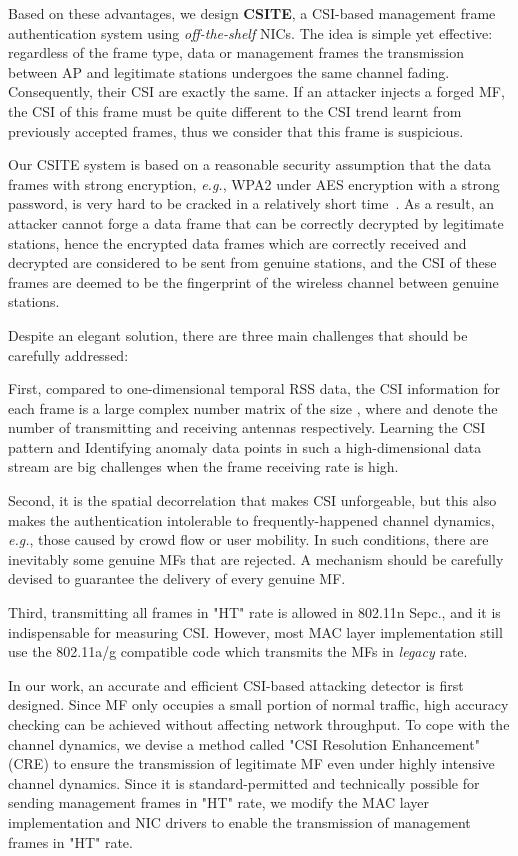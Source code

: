 \documentclass[conference]{IEEEtran}
\def\eg{\textit{e.g.}\xspace}
\begin{document}
Based on these advantages, we design \textbf{CSITE}, a CSI-based management frame
authentication system using \textit{off-the-shelf} NICs.
The idea is simple yet effective: regardless of the frame type, data or management frames
 the transmission between AP and legitimate stations undergoes
 the same channel fading. Consequently, their CSI are exactly the same.
If an attacker injects a forged MF, the CSI of this frame
 must be quite different to the CSI trend learnt from previously
 accepted frames, thus we consider that this frame is suspicious.

Our CSITE system is based on a reasonable security assumption that the
 data frames with strong encryption, \eg, WPA2 under AES encryption
 with a strong password, is very hard to be cracked in a relatively short time~\cite{mitchell2005security}.
As a result, an attacker cannot forge a data
 frame that can be correctly decrypted by legitimate
 stations, hence the encrypted data frames which are correctly received and decrypted are considered to be
 sent from genuine stations, and the CSI of these frames are deemed to be the fingerprint of the wireless channel between genuine stations.

Despite an elegant solution, there are three main challenges that should be
 carefully addressed:

First, compared to one-dimensional temporal RSS data, the CSI information for each frame is a
 large complex number matrix of the size , where  and  denote the number of
 transmitting and receiving antennas respectively. Learning the CSI pattern and
Identifying anomaly data points in such a high-dimensional data stream
are big challenges when the frame receiving rate  is high.

Second, it is the spatial decorrelation that makes CSI
 unforgeable, but this also makes the authentication intolerable to frequently-happened channel dynamics, \eg, those caused by crowd flow or user mobility.
In such conditions, there are inevitably some genuine MFs that are rejected.
 A mechanism should be carefully devised to
 guarantee the delivery of every genuine MF.

Third, transmitting all frames in "HT" rate is allowed in 802.11n Sepc.,
and it is indispensable for measuring CSI.
However, most MAC layer implementation still use the 802.11a/g compatible code which transmits the MFs in \textit{legacy} rate.

In our work, an accurate and efficient CSI-based attacking detector is first designed. Since MF only occupies a small portion of normal traffic, high accuracy checking can be achieved without affecting network throughput.
To cope with the channel dynamics, we devise a
 method called "CSI Resolution Enhancement" (CRE) to ensure the
 transmission of legitimate MF even under highly intensive channel
 dynamics.
Since it is standard-permitted and technically possible for sending
 management frames in "HT" rate,
 we modify the MAC layer implementation
 and  NIC drivers to enable the transmission of management frames in
 "HT" rate.
\end{document}
